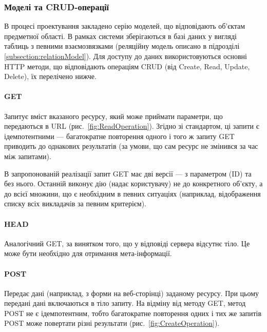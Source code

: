 \subsubsection{Моделі та CRUD-операції} \label{subs:crud}

В процесі проектування закладено серію моделей, що відповідають об’єктам предметної області. В рамках системи зберігаються в базі даних у вигляді таблиць з певними взаємозвязками (реляційну модель описано в підрозділі \ref{subsection:relationModel}). Для доступу до даних використовуються основні HTTP методи, що відповідають операціям CRUD (від Create, Read, Update, Delete), їх перелічено нижче.

\paragraph{GET}

Запитує вміст вказаного ресурсу, який може приймати параметри, що передаються в URL (рис.~\ref{fig:ReadOperation}). Згідно зі стандартом, ці запити є ідемпотентними — багатократне повторення одного і того ж запиту GET приводить до однакових результатів (за умови, що сам ресурс не змінився за час між запитами).

В запропонованій реалізації запит GET має дві версії — з параметром (ID) та без нього. Останній виконує дію (надає користувачу) не до конкретного об’єкту, а до всієї множини, що є необхідним в певних ситуаціях (наприклад, відображення списку всіх викладачів за певним критерієм).

\paragraph{HEAD}

Аналогічний GET, за винятком того, що у відповіді сервера відсутнє тіло. Це може бути необхідно для отримання мета-інформації.

\paragraph{POST}

Передає дані (наприклад, з форми на веб-сторінці) заданому ресурсу. При цьому передані дані включаються в тіло запиту. На відміну від методу GET, метод POST не є ідемпотентним, тобто багатократне повторення одних і тих же запитів POST може повертати різні результати (рис.~\ref{fig:CreateOperation}).

